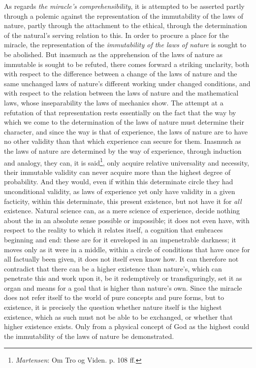 \documentclass[12pt,a4paper]{book}
\begin{document}
As regards \emph{the miracle's comprehensibility}, it is attempted to be asserted partly through a
polemic against the representation of the immutability of the laws of nature, partly through
the attachment to the ethical, through the determination of the natural's serving relation
to this. In order to procure a place for the miracle, the representation of the \emph{immutability
of the laws of nature} is sought to be abolished. But inasmuch as the apprehension of the laws
of nature as immutable is sought to be refuted, there comes forward a striking unclarity, both
with respect to the difference between a change of the laws of nature and the same unchanged
laws of nature's different working under changed conditions, and with respect to the relation
between the laws of nature and the mathematical laws, whose inseparability the laws of
mechanics show. The attempt at a refutation of that representation rests essentially on the
fact that the way by which we come to the determination of the laws of nature must determine
their character, and since the way is that of experience, the laws of nature are to have no
other validity than that which experience can secure for them. Inasmuch as the laws of nature
are determined by the way of experience, through induction and analogy, they can, it is
said\footnote{\emph{Martensen}: Om Tro og Viden. p. 108 ff.}, only acquire relative universality and
necessity, their immutable validity can never acquire more than the highest degree of
probability. And they would, even if within this determinate circle they had unconditional
validity, as laws of experience yet only have validity in a given facticity, within this
determinate, this present existence, but not have it for \emph{all} existence. Natural science can,
as a mere science of experience, decide nothing about the in an absolute sense possible or
impossible; it does not even have, with respect to the reality to which it relates itself, a
cognition that embraces beginning and end: these are for it enveloped in an impenetrable
darkness; it moves only as it were in a middle, within a circle of conditions that have once
for all factually been given, it does not itself even know how. It can therefore not
contradict that there can be a higher existence than nature's, which can penetrate this and
work upon it, be it redemptively or transfiguringly, set it as organ and means for a goal
that is higher than nature's own. Since the miracle does not refer itself to the world of
pure concepts and pure forms, but to existence, it is precisely the question whether nature
itself is the highest existence, which as such must not be able to be exchanged, or whether
that higher existence exists. Only from a physical concept of God as the highest could the
immutability of the laws of nature be demonstrated.
\end{document}
